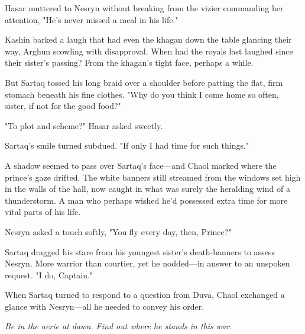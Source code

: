 Hasar muttered to Nesryn without breaking from the vizier commanding her attention, "He's never missed a meal in his life."

Kashin barked a laugh that had even the khagan down the table glancing their way, Arghun scowling with disapproval.
When had the royals last laughed since their sister's passing?
From the khagan's tight face, perhaps a while.

But Sartaq tossed his long braid over a shoulder before patting the flat, firm stomach beneath his fine clothes.
"Why do you think I come home so often, sister, if not for the good food?"

"To plot and scheme?"
Hasar asked sweetly.

Sartaq's smile turned subdued.
"If only I had time for such things."

A shadow seemed to pass over Sartaq's face---and Chaol marked where the prince's gaze drifted.
The white banners still streamed from the windows set high in the walls of the hall, now caught in what was surely the heralding wind of a thunderstorm.
A man who perhaps wished he'd possessed extra time for more vital parts of his life.

Nesryn asked a touch softly, "You fly every day, then, Prince?"

Sartaq dragged his stare from his youngest sister's death-banners to assess Nesryn.
More warrior than courtier, yet he nodded---in answer to an unspoken request.
"I do, Captain."

When Sartaq turned to respond to a question from Duva, Chaol exchanged a glance with Nesryn---all he needed to convey his order.

\emph{Be in the aerie at dawn.
Find out where he stands in this war.}

